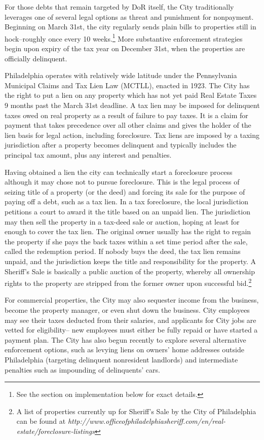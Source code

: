 \documentclass[12pt,titlepage]{article}
\begin{document}
For those debts that remain targeted by DoR itself, the City
traditionally leverages one of several legal options as threat and
punishment for nonpayment. Beginning on March 31st, the city regularly
sends plain bills to properties still in hock--roughly once every 10
weeks.\footnote{See the section on implementation below for exact
  details.} More substantive enforcement strategies begin upon expiry
of the tax year on December 31st, when the properties are officially
delinquent.

Philadelphia operates with relatively wide latitude under the
Pennsylvania Municipal Claims and Tax Lien Law (MCTLL), enacted in
1923. The City has the right to put a lien on any property which has not yet
paid Real Estate Taxes 9 months past the March 31st deadline. A tax
lien may be imposed for delinquent taxes owed on real property as a
result of failure to pay taxes.  It is a claim for payment that takes
precedence over all other claims and gives the holder of the lien
basis for legal action, including foreclosure. Tax liens are imposed
by a taxing jurisdiction after a property becomes delinquent and
typically includes the principal tax amount, plus any interest and
penalties.

Having obtained a lien the city can technically start a foreclosure process although it may chose not to pursue foreclosure. This
is the legal process of seizing title of a property (or the deed) and
forcing its sale for the purpose of paying off a debt, such as a tax
lien. In a tax foreclosure, the local jurisdiction petitions a court
to award it the title based on an unpaid lien. The jurisdiction may
then sell the property in a tax-deed sale or auction, hoping at least
for enough to cover the tax lien. The original owner usually has the
right to regain the property if she  pays the back taxes within a
set time period after the sale, called the redemption period. If
nobody buys the deed, the tax lien remains unpaid, and the
jurisdiction keeps the title and responsibility for the
property. A Sheriff's Sale is basically a public auction
of the property, whereby all ownership rights to the property are
stripped from the former owner upon successful bid.\footnote{A list of
  properties currently up for Sheriff's Sale by the City of
  Philadelphia can be found at
  \it{http://www.officeofphiladelphiasheriff.com/en/real-estate/foreclosure-listings}}

For commercial properties, the City may also sequester income from the
business, become the property manager, or even shut down the
business. City employees may see their taxes deducted from their
salaries, and applicants for City jobs are vetted for eligibility--
new employees must either be fully repaid or have started a payment
plan. The City has also begun recently to explore several
  alternative enforcement options, such as levying liens on owners'
  home addresses outside Philadelphia (targeting delinquent
  nonresident landlords) and intermediate penalties such as impounding
  of delinquents' cars.
\end{document}
